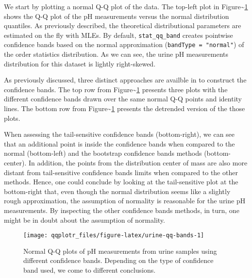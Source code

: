 We start by plotting a normal Q-Q plot of the data. The top-left plot in
Figure\textasciitilde{}\ref{fig:urine-qq-bands} shows the Q-Q plot of
the pH measurements versus the normal distribution quantiles. As
previously described, the theoretical distributional parameters are
estimated on the fly with MLEs. By default, \texttt{stat\_qq\_band}
creates pointwise confidence bands based on the normal approximation
(\texttt{bandType\ =\ "normal"}) of the order statistics distribution.
As we can see, the urine pH measurements distribution for this dataset
is lightly right-skewed.

As previously discussed, three distinct approaches are availble in
 to construct the confidence bands. The top row from
Figure\textasciitilde{}\ref{fig:urine-qq-bands} presents three plots
with the different confidence bands drawn over the same normal Q-Q
points and identity lines. The bottom row from
Figure\textasciitilde{}\ref{fig:urine-qq-bands} presents the detrended
version of the those plots.


When assessing the tail-sensitive confidence bands (bottom-right), we
can see that an additional point is inside the confidence bands when
compared to the normal (bottom-left) and the bootstrap confidence bands
methods (bottom-center). In addition, the points from the distribution
center of mass are also more distant from tail-sensitive confidence
bands limits when compared to the other methods. Hence, one could
conclude by looking at the tail-sensitive plot at the bottom-right that,
even though the normal distribution seems like a slightly rough
approximation, the assumption of normality is reasonable for the urine
pH measurements. By inspecting the other confidence bands methods, in
turn, one might be in doubt about the assumption of normality.

\begin{Schunk}
\begin{figure}

{\centering \texttt{[image: qqplotr\_files/figure-latex/urine-qq-bands-1]} 

}

\caption{Normal Q-Q plots of pH measurements from urine samples using different confidence bands. Depending on the type of confidence band used, we come to different conclusions. }\label{fig:urine-qq-bands}
\end{figure}
\end{Schunk}

